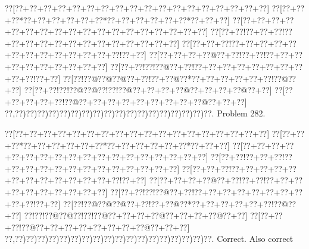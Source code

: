 \documentclass[a5paper]{article}
\begin{document}
\newpage
\begin{center}
{\goo
\0??[\0??+\0??+\0??+\0??+\0??+\0??+\0??+\0??+\0??+\0??+\0??+\0??+\0??+\0??+\0??+\0??+\0??+\0??]
\0??[\0??+\0??+\0??*\0??+\0??+\0??+\0??+\0??+\0??*\0??+\0??+\0??+\0??+\0??+\0??*\0??+\0??+\0??]
\0??[\0??+\0??+\0??+\0??+\0??+\0??+\0??+\0??+\0??+\0??+\0??+\0??+\0??+\0??+\0??+\0??+\0??+\0??]
\0??[\0??+\0??!\0??+\0??+\0??!\0??+\0??+\0??+\0??+\0??+\0??+\0??+\0??+\0??+\0??+\0??+\0??+\0??]
\0??[\0??+\0??+\0??!\0??+\0??+\0??+\0??+\0??+\0??+\0??+\0??+\0??+\0??+\0??+\0??+\0??!\0??+\0??]
\0??[\0??+\0??+\0??+\0??@\0??+\0??!\0??+\0??!\0??+\0??+\0??+\0??+\0??+\0??+\0??+\0??+\0??+\0??]
\0??[\0??+\0??!\0??!\0??@\0??+\0??!\0??+\0??+\0??+\0??+\0??+\0??+\0??+\0??+\0??+\0??!\0??+\0??]
\0??[\0??!\0??@\0??@\0??@\0??+\0??!\0??+\0??@\0??*\0??+\0??+\0??+\0??+\0??+\0??!\0??@\0??+\0??]
\0??[\0??+\0??!\0??!\0??@\0??@\0??!\0??!\0??@\0??+\0??+\0??+\0??@\0??+\0??+\0??+\0??@\0??+\0??]
\0??[\0??+\0??+\0??+\0??+\0??!\0??@\0??+\0??+\0??+\0??+\0??+\0??+\0??+\0??+\0??@\0??+\0??+\0??]
\0??,\0??)\0??)\0??)\0??)\0??)\0??)\0??)\0??)\0??)\0??)\0??)\0??)\0??)\0??)\0??)\0??)\0??)\0??.
}
Problem 282.

\end{center}
\begin{center}
{\goo
\0??[\0??+\0??+\0??+\0??+\0??+\0??+\0??+\0??+\0??+\0??+\0??+\0??+\0??+\0??+\0??+\0??+\0??+\0??]
\0??[\0??+\0??+\0??*\0??+\0??+\0??+\0??+\0??+\0??*\0??+\0??+\0??+\0??+\0??+\0??*\0??+\0??+\0??]
\0??[\0??+\0??+\0??+\0??+\0??+\0??+\0??+\0??+\0??+\0??+\0??+\0??+\0??+\0??+\0??+\0??+\0??+\0??]
\0??[\0??+\0??!\0??+\0??+\0??!\0??+\0??+\0??+\0??+\0??+\0??+\0??+\0??+\0??+\0??+\0??+\0??+\0??]
\0??[\0??+\0??+\0??!\0??+\0??+\0??+\0??+\0??+\0??+\0??+\0??+\0??+\0??+\0??+\0??+\0??!\0??+\0??]
\0??[\0??+\0??+\0??+\0??@\0??+\0??!\0??+\0??!\0??+\0??+\0??+\0??+\0??+\0??+\0??+\0??+\0??+\0??]
\0??[\0??+\0??!\0??!\0??@\0??+\0??!\0??+\0??+\0??+\0??+\0??+\0??+\0??+\0??+\0??+\0??!\0??+\0??]
\0??[\0??!\0??@\0??@\0??@\0??+\0??!\0??+\0??@\0??*\0??+\0??+\0??+\0??+\0??+\0??!\0??@\0??+\0??]
\0??!\0??!\0??@\0??@\0??!\0??!\0??@\0??+\0??+\0??+\0??@\0??+\0??+\0??+\0??@\0??+\0??]
\0??[\0??+\0??+\0??!\0??@\0??+\0??+\0??+\0??+\0??+\0??+\0??+\0??@\0??+\0??+\0??]
\0??,\0??)\0??)\0??)\0??)\0??)\0??)\0??)\0??)\0??)\0??)\0??)\0??)\0??)\0??)\0??)\0??)\0??)\0??.
}
Correct. Also correct

\end{center}
\end{document}
